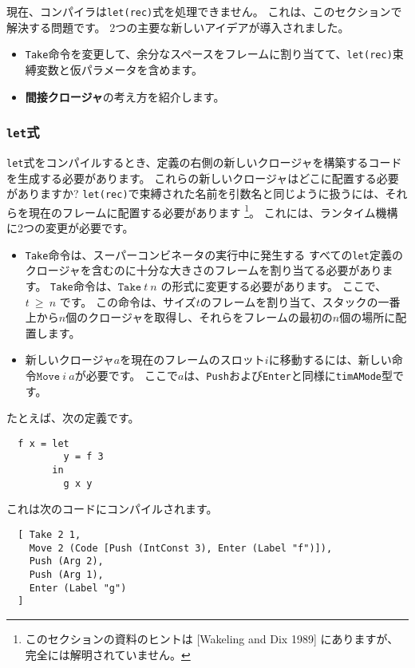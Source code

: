 \documentclass{jarticle}
\begin{document}
現在、コンパイラは\texttt{let(rec)}式を処理できません。
これは、このセクションで解決する問題です。
2つの主要な新しいアイデアが導入されました。

\begin{itemize}
	\item \texttt{Take}命令を変更して、余分なスペースをフレームに割り当てて、\texttt{let(rec)}束縛変数と仮パラメータを含めます。
	\item \textbf{間接クロージャ}の考え方を紹介します。
\end{itemize}

\subsubsection{\texttt{let}式}

\texttt{let}式をコンパイルするとき、定義の右側の新しいクロージャを構築するコードを生成する必要があります。
これらの新しいクロージャはどこに配置する必要がありますか?
\texttt{let(rec)}で束縛された名前を引数名と同じように扱うには、それらを現在のフレームに配置する必要があります
\footnote{このセクションの資料のヒントは [Wakeling and Dix 1989] にありますが、完全には解明されていません。}。
これには、ランタイム機構に2つの変更が必要です。

\begin{itemize}
	\item \texttt{Take}命令は、スーパーコンビネータの実行中に発生する
	      すべての\texttt{let}定義のクロージャを含むのに十分な大きさのフレームを割り当てる必要があります。
	      \texttt{Take}命令は、$\texttt{Take} ~ t ~ n$ の形式に変更する必要があります。
	      ここで、$t ~ \ge ~ n$ です。
	      この命令は、サイズ$t$のフレームを割り当て、スタックの一番上から$n$個のクロージャを取得し、それらをフレームの最初の$n$個の場所に配置します。
	\item 新しいクロージャ$a$を現在のフレームのスロット$i$に移動するには、新しい命令$\texttt{Move} ~ i ~ a$が必要です。
	      ここで$a$は、\texttt{Push}および\texttt{Enter}と同様に\texttt{timAMode}型です。
\end{itemize}

たとえば、次の定義です。

\begin{verbatim}
  f x = let
          y = f 3
        in
          g x y
\end{verbatim}

これは次のコードにコンパイルされます。

\begin{verbatim}
  [ Take 2 1,
    Move 2 (Code [Push (IntConst 3), Enter (Label "f")]),
    Push (Arg 2),
    Push (Arg 1),
    Enter (Label "g")
  ]
\end{verbatim}
\end{document}
